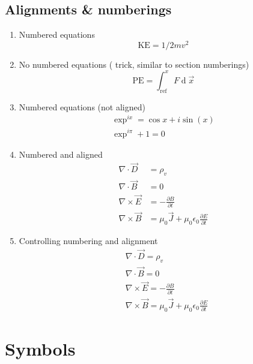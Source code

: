 \documentclass[12pt]{article}
\begin{document}
\subsection*{Alignments \& numberings}
\begin{enumerate}
	\item Numbered equations
	\begin{equation}
		\text{KE} = 1/2mv^2
	\end{equation}
	
	\item No numbered equations (\* trick, similar to section numberings)
	\begin{equation*}
		\text{PE} = \int_{\text{ref}}^{x} F \operatorname{d}\!\overrightarrow{x}
	\end{equation*}	
	
	\item Numbered equations (not aligned)
	\begin{gather}
		\exp^{ix} = \cos{x} + i\sin(x) \\
		\exp^{i\pi} + 1 = 0
	\end{gather}
	
	\item Numbered and aligned
	\begin{align}
		\nabla \cdot \vec{D} &= \rho_v \\
		\nabla \cdot \vec{B} &= 0 \\
		\nabla \times \vec{E} &= - \frac{\partial B}{\partial t} \\
		\nabla \times \vec{B} &= \mu_{0}\vec{J} +
		\mu_{0}\epsilon_{0}\frac{\partial E}{\partial t}
	\end{align}
	
	\item Controlling numbering and alignment
	\begin{align}
		&\nabla \cdot \vec{D} = \rho_v \nonumber \\
		&\nabla \cdot \vec{B} = 0 \\
		&\nabla \times \vec{E} = - \frac{\partial B}{\partial t} \\
		&\nabla \times \vec{B} = \mu_{0}\vec{J} +
		\mu_{0}\epsilon_{0}\frac{\partial E}{\partial t} \nonumber
	\end{align}
\end{enumerate}


\section{Symbols}
\end{document}
